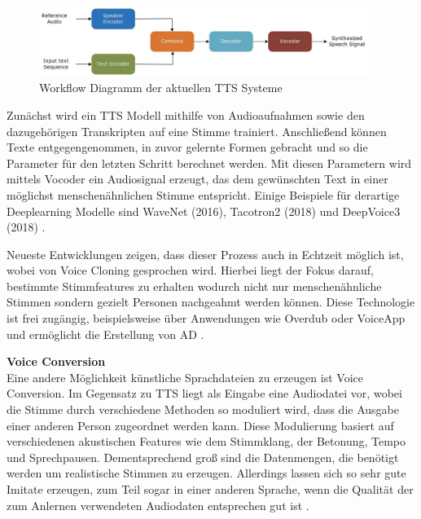 \begin{figure}[htp]
\begin{center}
  \includegraphics[width=0.95\textwidth]{assets/TTS.png}
  \caption[labelInTOC]{Workflow Diagramm der aktuellen TTS Systeme \citep[][]{Masood2022}}
  \label{fig:tts}
\end{center}
\end{figure}

Zunächst wird ein TTS Modell mithilfe von Audioaufnahmen sowie den dazugehörigen Transkripten auf eine Stimme trainiert.
Anschließend können Texte entgegengenommen, in zuvor gelernte Formen gebracht und so die Parameter für den letzten Schritt berechnet werden.
Mit diesen Parametern wird mittels Vocoder ein Audiosignal erzeugt, das dem gewünschten Text in einer möglichst menschenähnlichen Stimme entspricht.
Einige Beispiele für derartige Deeplearning Modelle sind WaveNet (2016), Tacotron2 (2018) und DeepVoice3 (2018) \citep[vgl.][]{Almutairi2022}.

Neueste Entwicklungen zeigen, dass dieser Prozess auch in Echtzeit möglich ist, wobei von Voice Cloning gesprochen wird.
Hierbei liegt der Fokus darauf, bestimmte Stimmfeatures zu erhalten wodurch nicht nur menschenähnliche Stimmen sondern gezielt Personen nachgeahmt werden können.
Diese Technologie ist frei zugängig, beispielsweise über Anwendungen wie Overdub oder VoiceApp und ermöglicht die Erstellung von AD \citep[][]{Masood2022}.

\textbf{Voice Conversion}\\
Eine andere Möglichkeit künstliche Sprachdateien zu erzeugen ist Voice Conversion.
Im Gegensatz zu TTS liegt als Eingabe eine Audiodatei vor, wobei die Stimme durch verschiedene Methoden so moduliert wird, dass die Ausgabe einer anderen Person zugeordnet werden kann.
Diese Modulierung basiert auf verschiedenen akustischen Features wie dem Stimmklang, der Betonung, Tempo und Sprechpausen.
Dementsprechend groß sind die Datenmengen, die benötigt werden um realistische Stimmen zu erzeugen.
Allerdings lassen sich so sehr gute Imitate erzeugen, zum Teil sogar in einer anderen Sprache, wenn die Qualität der zum Anlernen verwendeten Audiodaten entsprechen gut ist \citep[][]{Masood2022}.

